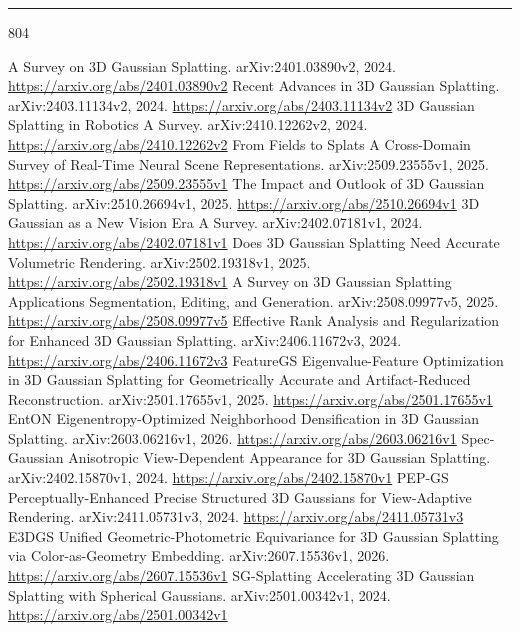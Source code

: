 \documentclass[11pt]{article}
\begin{document}
\begin{center}\rule{0.5\linewidth}{0.5pt}\end{center}


\begin{thebibliography}{804}
 A Survey on 3D Gaussian Splatting. arXiv:2401.03890v2, 2024. \url{https://arxiv.org/abs/2401.03890v2}
 Recent Advances in 3D Gaussian Splatting. arXiv:2403.11134v2, 2024. \url{https://arxiv.org/abs/2403.11134v2}
 3D Gaussian Splatting in Robotics A Survey. arXiv:2410.12262v2, 2024. \url{https://arxiv.org/abs/2410.12262v2}
 From Fields to Splats A Cross-Domain Survey of Real-Time Neural Scene Representations. arXiv:2509.23555v1, 2025. \url{https://arxiv.org/abs/2509.23555v1}
 The Impact and Outlook of 3D Gaussian Splatting. arXiv:2510.26694v1, 2025. \url{https://arxiv.org/abs/2510.26694v1}
 3D Gaussian as a New Vision Era A Survey. arXiv:2402.07181v1, 2024. \url{https://arxiv.org/abs/2402.07181v1}
 Does 3D Gaussian Splatting Need Accurate Volumetric Rendering. arXiv:2502.19318v1, 2025. \url{https://arxiv.org/abs/2502.19318v1}
 A Survey on 3D Gaussian Splatting Applications Segmentation, Editing, and Generation. arXiv:2508.09977v5, 2025. \url{https://arxiv.org/abs/2508.09977v5}
 Effective Rank Analysis and Regularization for Enhanced 3D Gaussian Splatting. arXiv:2406.11672v3, 2024. \url{https://arxiv.org/abs/2406.11672v3}
 FeatureGS Eigenvalue-Feature Optimization in 3D Gaussian Splatting for Geometrically Accurate and Artifact-Reduced Reconstruction. arXiv:2501.17655v1, 2025. \url{https://arxiv.org/abs/2501.17655v1}
 EntON Eigenentropy-Optimized Neighborhood Densification in 3D Gaussian Splatting. arXiv:2603.06216v1, 2026. \url{https://arxiv.org/abs/2603.06216v1}
 Spec-Gaussian Anisotropic View-Dependent Appearance for 3D Gaussian Splatting. arXiv:2402.15870v1, 2024. \url{https://arxiv.org/abs/2402.15870v1}
 PEP-GS Perceptually-Enhanced Precise Structured 3D Gaussians for View-Adaptive Rendering. arXiv:2411.05731v3, 2024. \url{https://arxiv.org/abs/2411.05731v3}
 E3DGS Unified Geometric-Photometric Equivariance for 3D Gaussian Splatting via Color-as-Geometry Embedding. arXiv:2607.15536v1, 2026. \url{https://arxiv.org/abs/2607.15536v1}
 SG-Splatting Accelerating 3D Gaussian Splatting with Spherical Gaussians. arXiv:2501.00342v1, 2024. \url{https://arxiv.org/abs/2501.00342v1}

\end{thebibliography}
\end{document}
